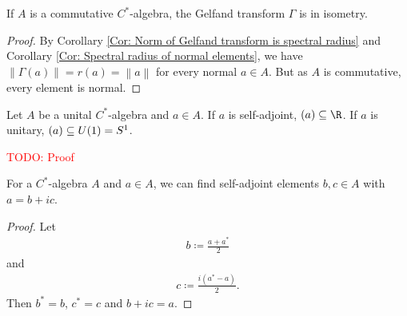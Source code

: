 \documentclass[american]{scrartcl}
\newcommand{\todo}[1]{\textcolor{red}{TODO: #1}}
\renewcommand{\norm}[1]{\left\lVert #1 \right\rVert}
\let\sp\relax
\begin{document}
\begin{corollary}\label{Cor: Gelfand transform injective}
	If $A$ is a commutative $C^*$-algebra, the Gelfand transform $\Gamma$ is in isometry.
\end{corollary}
\begin{proof}
	By Corollary \ref{Cor: Norm of Gelfand transform is spectral radius} and Corollary \ref{Cor: Spectral radius of normal elements}, we have $\norm{\Gamma(a)}=r(a)=\norm{a}$ for every normal $a\in A$. But as $A$ is commutative, every element is normal.
\end{proof}
\begin{proposition}\label{Prop: Spectrum of self-adjoint and unitary elements}
	Let $A$ be a unital $C^*$-algebra and $a\in A$. If $a$ is self-adjoint, $\sp(a)\subseteq\R$. If $a$ is unitary, $\sp(a)\subseteq U(1)=S^1$.
\end{proposition}
\todo{Proof}
\begin{lemma}\label{Lemma: Real and imaginary part in C^*-algebra}
	For a $C^*$-algebra $A$ and $a\in A$, we can find self-adjoint elements $b,c\in A$ with $a=b+ic$.
\end{lemma}
\begin{proof}
	Let 
	\begin{align*}
		b\coloneqq \frac{a+a^*}{2}
	\end{align*}
	and
	\begin{align*}
		c\coloneqq \frac{i(a^*-a)}{2}.
	\end{align*}
	Then $b^*=b$, $c^*=c$ and $b+ic=a$.
\end{proof}
\end{document}
